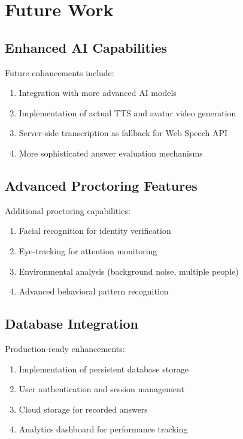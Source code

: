 \documentclass[12pt, conference]{IEEEtran}
\begin{document}
\section{Future Work}

\subsection{Enhanced AI Capabilities}

Future enhancements include:
\begin{enumerate}
    \item Integration with more advanced AI models
    \item Implementation of actual TTS and avatar video generation
    \item Server-side transcription as fallback for Web Speech API
    \item More sophisticated answer evaluation mechanisms
\end{enumerate}

\subsection{Advanced Proctoring Features}

Additional proctoring capabilities:
\begin{enumerate}
    \item Facial recognition for identity verification
    \item Eye-tracking for attention monitoring
    \item Environmental analysis (background noise, multiple people)
    \item Advanced behavioral pattern recognition
\end{enumerate}

\subsection{Database Integration}

Production-ready enhancements:
\begin{enumerate}
    \item Implementation of persistent database storage
    \item User authentication and session management
    \item Cloud storage for recorded answers
    \item Analytics dashboard for performance tracking
\end{enumerate}
\end{document}
